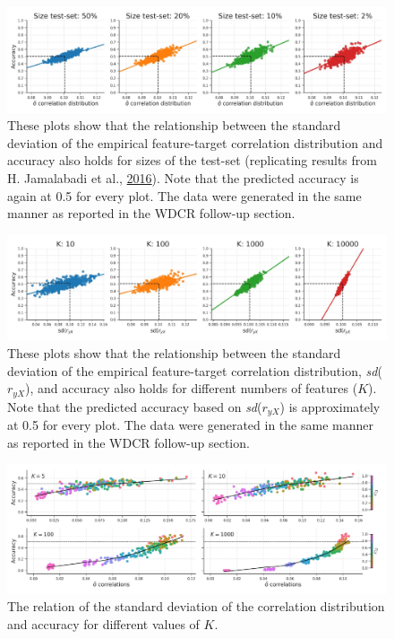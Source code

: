 \documentclass[11pt,american,a4paper,oneside,]{memoir} %
\begin{document}
\begin{figure}
\centering
\includegraphics{_bookdown_files/confounds-decoding-files/figures/figure_S16.pdf}
\caption{\label{fig:fig-confounds-decoding-S16}These plots show that the relationship between the standard deviation of the empirical feature-target correlation distribution and accuracy also holds for sizes of the test-set (replicating results from H. Jamalabadi et al., \protect\hyperlink{ref-Jamalabadi2016-gr}{2016}). Note that the predicted accuracy is again at 0.5 for every plot. The data were generated in the same manner as reported in the WDCR follow-up section.}
\end{figure}



\begin{figure}
\centering
\includegraphics{_bookdown_files/confounds-decoding-files/figures/figure_S17.pdf}
\caption{\label{fig:fig-confounds-decoding-S17}These plots show that the relationship between the standard deviation of the empirical feature-target correlation distribution, \emph{sd}(\(r_{yX}\)), and accuracy also holds for different numbers of features (\(K\)). Note that the predicted accuracy based on \emph{sd}(\(r_{yX}\)) is approximately at 0.5 for every plot. The data were generated in the same manner as reported in the WDCR follow-up section.}
\end{figure}



\begin{figure}
\centering
\includegraphics{_bookdown_files/confounds-decoding-files/figures/figure_S18.pdf}
\caption{\label{fig:fig-confounds-decoding-S18}The relation of the standard deviation of the correlation distribution and accuracy for different values of \(K\).}
\end{figure}
\end{document}
